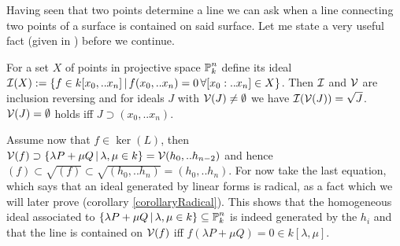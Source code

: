 Having seen that two points determine a line we can ask when a line connecting two points of a surface is contained on said surface.
Let me state a very useful fact (given in \cite[section 5.3]{reid1988undergraduate}) before we continue.

\begin{theorem}
For a set $X$ of points in projective space $\operatorname{\mathbb P}^n_k$ define its ideal $\operatorname{\mathcal I}(X) := \left\lbrace f \in k[x_0,..x_n]\,|\, f(x_0,..x_n) = 0\,\forall [x_0:..x_n] \in X\right\rbrace$.
Then $\operatorname{\mathcal I}$ and $\operatorname{\mathcal V}$ are inclusion reversing and for ideals $J$ with $\operatorname{\mathcal V}(J) \neq \emptyset$ we have $\operatorname{\mathcal I}(\operatorname{\mathcal V}(J)) = \sqrt{J}$.
$\operatorname{\mathcal V}(J) = \emptyset$ holds iff $J \supset (x_0,..x_n)$.
\end{theorem}

Assume now that $f \in \ker(L)$, then $\operatorname{\mathcal V}(f) \supset \left\lbrace\lambda P + \mu Q\,|\, \lambda, \mu \in k\right\rbrace = \operatorname{\mathcal V}(h_0,..h_{n-2})$ and hence $(f) \subset \sqrt{(f)} \subset \sqrt{(h_0,..h_n)} = (h_0,..h_n)$.
For now take the last equation, which says that an ideal generated by linear forms is radical, as a fact which we will later prove (corollary \ref{corollaryRadical}).
This shows that the homogeneous ideal associated to $\left\lbrace\lambda P + \mu Q\,|\, \lambda, \mu \in k\right\rbrace \subseteq \operatorname{\mathbb P}^n_k$ is indeed generated by the $h_i$
and that the line is contained on $\operatorname{\mathcal V}(f)$ iff $f(\lambda P + \mu Q) = 0 \in k[\lambda,\mu]$.

